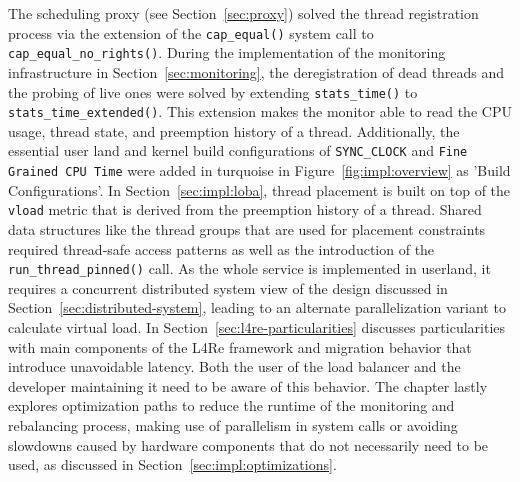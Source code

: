 The scheduling proxy (see Section~\ref{sec:proxy}) solved the thread registration process via the extension of the \texttt{cap\_equal()} system call to \texttt{cap\_equal\_no\_rights()}.
During the implementation of the monitoring infrastructure in Section~\ref{sec:monitoring}, the deregistration of dead threads and the probing of live ones were solved by extending \texttt{stats\_time()} to \texttt{stats\_time\_extended()}.
This extension makes the monitor able to read the CPU usage, thread state, and preemption history of a thread.
Additionally, the essential user land and kernel build configurations of \texttt{SYNC\_CLOCK} and \texttt{Fine Grained CPU Time} were added in turquoise in Figure~\ref{fig:impl:overview} as 'Build Configurations'.
In Section~\ref{sec:impl:loba}, thread placement is built on top of the \texttt{vload} metric that is derived from the preemption history of a thread.
Shared data structures like the thread groups that are used for placement constraints required thread-safe access patterns as well as the introduction of the \texttt{run\_thread\_pinned()} call.
As the whole service is implemented in userland, it requires a concurrent distributed system view of the design discussed in Section~\ref{sec:distributed-system}, leading to an alternate parallelization variant to calculate virtual load.
In Section~\ref{sec:l4re-particularities} discusses particularities with main components of the L4Re framework and migration behavior that introduce unavoidable latency.
Both the user of the load balancer and the developer maintaining it need to be aware of this behavior.
The chapter lastly explores optimization paths to reduce the runtime of the monitoring and rebalancing process, making use of parallelism in system calls or avoiding slowdowns caused by hardware components that do not necessarily need to be used, as discussed in Section~\ref{sec:impl:optimizations}.

\cleardoublepage

